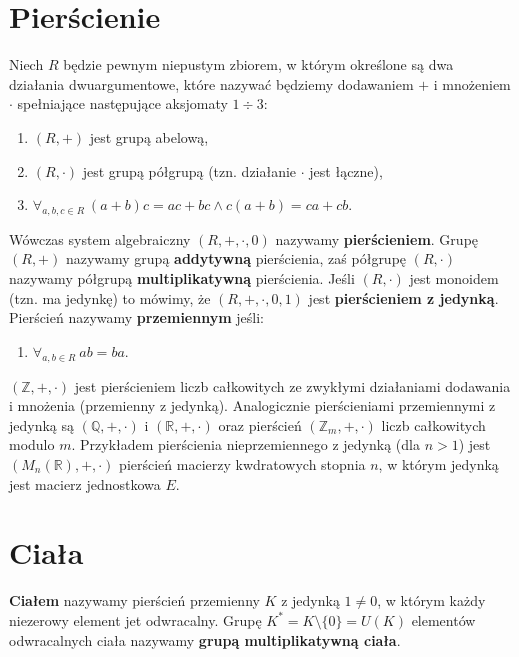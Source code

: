 \section{Pierścienie}
\begin{df}
Niech $R$ będzie pewnym niepustym zbiorem, w którym określone są dwa działania dwuargumentowe, które nazywać będziemy dodawaniem $+$ i mnożeniem $\cdot$ spełniające następujące aksjomaty $1\div 3$:
\begin{enumerate}[\rm(1)]
\item
$(R,+)$ jest grupą abelową,
\item
$(R,\cdot)$ jest grupą półgrupą (tzn. działanie $\cdot$ jest łączne),
\item
$\forall_{a,b,c\in R}\ (a+b)c=ac+bc\wedge c(a+b)=ca+cb$.
\end{enumerate}
Wówczas system algebraiczny $(R,+,\cdot,0)$ nazywamy \textbf{pierścieniem}. Grupę $(R,+)$ nazywamy grupą \textbf{addytywną} pierścienia, zaś półgrupę $(R,\cdot)$ nazywamy półgrupą \textbf{multiplikatywną} pierścienia. Jeśli $(R,\cdot)$ jest monoidem (tzn. ma jedynkę) to mówimy, że $(R,+,\cdot,0,1)$ jest \textbf{pierścieniem z jedynką}. Pierścień nazywamy \textbf{przemiennym} jeśli:
\begin{enumerate}[\rm(4)]
\item
$\forall_{a,b\in R}\ ab=ba$.
\end{enumerate}
\end{df}

\begin{przyk}
$(\mathbb{Z},+,\cdot)$ jest pierścieniem liczb całkowitych ze zwykłymi działaniami dodawania i mnożenia (przemienny z jedynką). Analogicznie pierścieniami przemiennymi z jedynką są $(\mathbb{Q},+,\cdot)$ i $(\mathbb{R},+,\cdot)$ oraz pierścień $(\mathbb{Z}_m,+,\cdot)$ liczb całkowitych modulo $m$. Przykładem pierścienia nieprzemiennego z jedynką (dla $n>1$) jest $(M_n(\mathbb{R}),+,\cdot)$ pierścień macierzy kwdratowych stopnia $n$, w którym jedynką jest macierz jednostkowa $E$.
\end{przyk}

\section{Ciała}

\begin{df}
\textbf{Ciałem} nazywamy pierścień przemienny $K$ z jedynką $1\neq 0$, w którym każdy niezerowy element jet odwracalny. Grupę $K^\ast=K\setminus\{0\}=U(K)$ elementów odwracalnych ciała nazywamy \textbf{grupą multiplikatywną ciała}.
\end{df}


